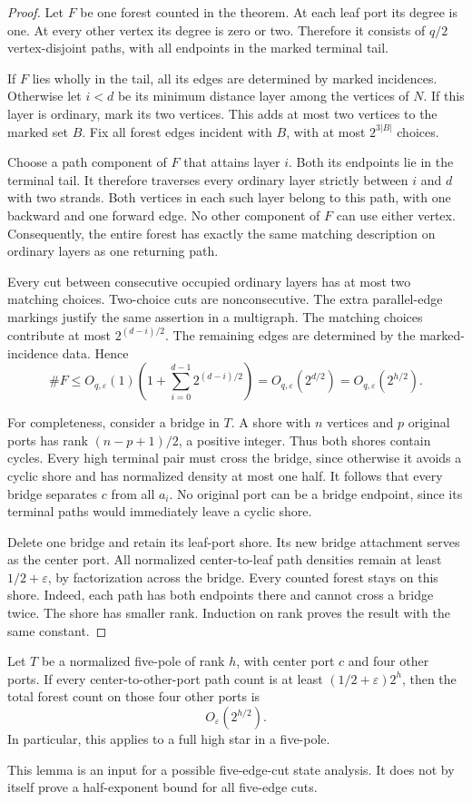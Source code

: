 \begin{proof}
Let $F$ be one forest counted in the theorem.
At each leaf port its degree is one.
At every other vertex its degree is zero or two.
Therefore it consists of $q/2$ vertex-disjoint paths, with all endpoints in the marked terminal tail.

If $F$ lies wholly in the tail, all its edges are determined by marked incidences.
Otherwise let $i<d$ be its minimum distance layer among the vertices of $N$.
If this layer is ordinary, mark its two vertices.
This adds at most two vertices to the marked set $B$.
Fix all forest edges incident with $B$, with at most $2^{3|B|}$ choices.

Choose a path component of $F$ that attains layer $i$.
Both its endpoints lie in the terminal tail.
It therefore traverses every ordinary layer strictly between $i$ and $d$ with two strands.
Both vertices in each such layer belong to this path, with one backward and one forward edge.
No other component of $F$ can use either vertex.
Consequently, the entire forest has exactly the same matching description on ordinary layers as one returning path.

Every cut between consecutive occupied ordinary layers has at most two matching choices.
Two-choice cuts are nonconsecutive.
The extra parallel-edge markings justify the same assertion in a multigraph.
The matching choices contribute at most $2^{(d-i)/2}$.
The remaining edges are determined by the marked-incidence data.
Hence
\[
 \#F\le O_{q,\varepsilon}(1)
 \left(1+\sum_{i=0}^{d-1}2^{(d-i)/2}\right)
 =O_{q,\varepsilon}(2^{d/2})
 =O_{q,\varepsilon}(2^{h/2}).
\]

For completeness, consider a bridge in $T$.
A shore with $n$ vertices and $p$ original ports has rank $(n-p+1)/2$, a positive integer.
Thus both shores contain cycles.
Every high terminal pair must cross the bridge, since otherwise it avoids a cyclic shore and has normalized density at most one half.
It follows that every bridge separates $c$ from all $a_i$.
No original port can be a bridge endpoint, since its terminal paths would immediately leave a cyclic shore.

Delete one bridge and retain its leaf-port shore.
Its new bridge attachment serves as the center port.
All normalized center-to-leaf path densities remain at least $1/2+\varepsilon$, by factorization across the bridge.
Every counted forest stays on this shore.
Indeed, each path has both endpoints there and cannot cross a bridge twice.
The shore has smaller rank.
Induction on rank proves the result with the same constant.
\end{proof}

\begin{corollary}
\label{cor:five-pole-four-far-forests}
Let $T$ be a normalized five-pole of rank $h$, with center port $c$ and four other ports.
If every center-to-other-port path count is at least $(1/2+\varepsilon)2^h$, then the total forest count on those four other ports is
\[
 O_\varepsilon(2^{h/2}).
\]
In particular, this applies to a full high star in a five-pole.
\end{corollary}

This lemma is an input for a possible five-edge-cut state analysis.
It does not by itself prove a half-exponent bound for all five-edge cuts.
